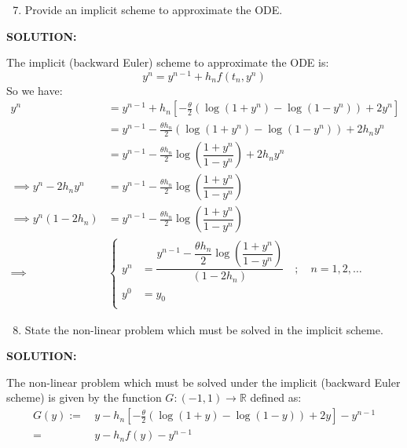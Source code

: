 \documentclass[]{article}
\begin{document}
\begin{enumerate}
    \setcounter{enumi}{6}
  \item Provide an implicit scheme to approximate the ODE.
  \end{enumerate}
  
  \noindent \textbf{SOLUTION:} \newline

    \noindent The implicit (backward Euler) scheme to approximate the ODE is:
    \[
    y^n = y^{n-1} + h_nf(t_n,y^n)
    \]
    So we have:
    \begin{align*}
        y^n &=y^{n-1} + h_n\left[ -\frac{\theta}{2}\left(\log(1+y^n)-\log(1-y^n)\right)+2y^n\right]\\
         &= y^{n-1} -\frac{\theta h_n}{2}\left(\log(1+y^n)-\log(1-y^n)\right)+2h_ny^n\\
         &= y^{n-1}-\frac{\theta h_n}{2} \log\left(\dfrac{1+y^n}{1-y^n}\right)+2h_ny^n\\
         \implies y^n-2h_ny^n &= y^{n-1}-\frac{\theta h_n}{2} \log\left(\dfrac{1+y^n}{1-y^n}\right)\\
         \implies y^n(1-2h_n)  &= y^{n-1}-\frac{\theta h_n}{2} \log\left(\dfrac{1+y^n}{1-y^n}\right)\\[5pt]
         \implies &\begin{cases}
             y^n  &= \dfrac{y^{n-1}-\dfrac{\theta h_n}{2} \log\left(\dfrac{1+y^n}{1-y^n}\right)}{(1-2h_n)} \quad;\quad n=1,2,\dots\\
             y^0 &= y_0\\[5pt]
         \end{cases}
    \end{align*}
\begin{enumerate}
    \setcounter{enumi}{7}
  \item State the non-linear problem which must be solved in the implicit scheme.
\end{enumerate}

  \noindent \textbf{SOLUTION:} \newline

\noindent The non-linear problem which must be solved under the implicit (backward Euler scheme) is given by the function $G:(-1,1)\to \mathbb{R}$ defined as:
\begin{align*}
    G(y) := \,& y- h_n\left[ -\frac{\theta}{2}\left(\log(1+y)-\log(1-y)\right)+2y\right]  - y^{n-1}\\[5pt]
    =\,& y - h_nf(y) - y^{n-1}
\end{align*}
\end{document}
